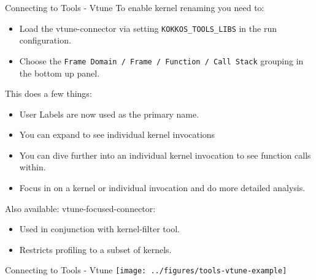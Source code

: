 
\begin{frame}[fragile]{Connecting to Tools - Vtune}
  To enable kernel renaming you need to:
  \begin{itemize}
    \item Load the vtune-connector via setting \texttt{KOKKOS\_TOOLS\_LIBS} in the run configuration.
    \item Choose the \texttt{Frame Domain / Frame / Function / Call Stack} grouping in the bottom up panel.
  \end{itemize}

  This does a few things:
  \begin{itemize}
    \item User Labels are now used as the primary name.
    \item You can expand to see individual kernel invocations
    \item You can dive further into an individual kernel invocation to see function calls within.
    \item Focus in on a kernel or individual invocation and do more detailed analysis. 
  \end{itemize}

  Also available: vtune-focused-connector:
  \begin{itemize}
    \item Used in conjunction with kernel-filter tool.
    \item Restricts profiling to a subset of kernels.
  \end{itemize}
\end{frame}


\begin{frame}[fragile]{Connecting to Tools - Vtune}
  \texttt{[image: ../figures/tools-vtune-example]}

\end{frame}


